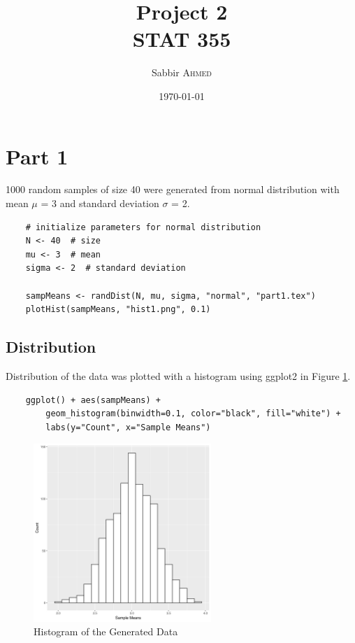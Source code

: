 \documentclass{article}
\title{Project 2 \\ STAT 355}  %
\author{Sabbir \textsc{Ahmed}}  %
\date{\today}  %
\begin{document}
    \maketitle %

    \section{Part 1}
        1000 random samples of size 40 were generated from normal distribution with mean $\mu$ = 3 and standard deviation $\sigma$ = 2.

\begin{lstlisting}
    # initialize parameters for normal distribution
    N <- 40  # size
    mu <- 3  # mean
    sigma <- 2  # standard deviation

    sampMeans <- randDist(N, mu, sigma, "normal", "part1.tex")
    plotHist(sampMeans, "hist1.png", 0.1)
\end{lstlisting}

        

        \subsection{Distribution}
            Distribution of the data was plotted with a histogram using ggplot2 in Figure \ref{fig:hist1}.
\begin{lstlisting}
    ggplot() + aes(sampMeans) + 
        geom_histogram(binwidth=0.1, color="black", fill="white") +
        labs(y="Count", x="Sample Means")
\end{lstlisting}

            \begin{figure}[h!]
                \begin{center}
                    \includegraphics[width=0.6\textwidth]{figures/hist1.png}
                    \caption{Histogram of the Generated Data} \label{fig:hist1}
                \end{center}
            \end{figure}
\end{document}
